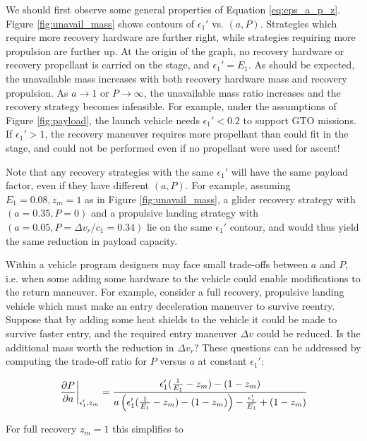 \documentclass[conf]{new-aiaa}
\begin{document}
We should first observe some general properties of Equation \ref{eq:eps_a_p_z}. Figure \ref{fig:unavail_mass} shows contours of $\epsilon_1'$ vs. $(a, P)$. Strategies which require more recovery hardware are further right, while strategies requiring more propulsion are further up. At the origin of the graph, no recovery hardware or recovery propellant is carried on the stage, and $\epsilon_1' = E_1$. As should be expected, the unavailable mass increases with both recovery hardware mass and recovery propulsion. As $a \rightarrow 1$ or $P \rightarrow \infty$, the unavailable mass ratio increases and the recovery strategy becomes infeasible. For example, under the assumptions of Figure \ref{fig:payload}, the launch vehicle needs $\epsilon_1' < 0.2$ to support GTO missions. If $\epsilon_1' > 1$, the recovery maneuver requires more propellant than could fit in the stage, and could not be performed even if no propellant were used for ascent!

Note that any recovery strategies with the same $\epsilon_1'$ will have the same payload factor, even if they have different $(a, P)$. For example, assuming $E_1=0.08, z_m=1$ as in Figure \ref{fig:unavail_mass}, a glider recovery strategy with $(a=0.35, P=0)$ and a propulsive landing strategy with $(a=0.05, P = \Delta v_r/c_1 = 0.34)$ lie on the same $\epsilon_1'$ contour, and would thus yield the same reduction in payload capacity.

Within a vehicle program designers may face small trade-offs between $a$ and $P$, i.e. when some adding some hardware to the vehicle could enable modifications to the return maneuver. For example, consider a full recovery, propulsive landing vehicle which must make an entry deceleration maneuver to survive reentry. Suppose that by adding some heat shields to the vehicle it could be made to survive faster entry, and the required entry maneuver $\Delta v$ could be reduced. Is the additional mass worth the reduction in $\Delta v_r$? These questions can be addressed by computing the trade-off ratio for $P$ versus $a$ at constant $\epsilon_1'$:

\begin{equation}
\label{eq:tradeoff_ratio}
\left. \pdv{P}{a} \right|_{\epsilon_1', z_m} = \frac{\epsilon_1' (\frac{1}{E_1} - z_m) - (1 - z_m)}{a \left( \epsilon_1' (\frac{1}{E_1} - z_m) - (1 - z_m) \right) - \frac{\epsilon_1'}{E_1} + (1 - z_m)}
\end{equation}

For full recovery $z_m=1$ this simplifies to
\end{document}
